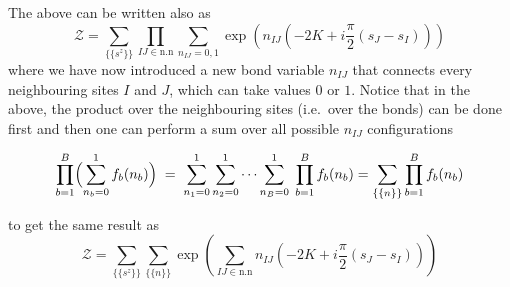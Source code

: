 \documentclass[11pt]{article}
\numberwithin{equation}{section}
\begin{document}
The above can be written also as 
\begin{equation*}
    \mathcal{Z}= \sum_{\{\{s^z\}\}} \prod_{IJ\in \text{n.n}} \sum_{n_{IJ}=0,1} \exp\left(n_{IJ} \left(-2K + i\frac{\pi}{2} (s_J-s_I)\right)\right)
\end{equation*}
where we have now introduced a new bond variable \(n_{IJ}\) that connects every neighbouring sites \(I\) and \(J\), which can take values \(0\) or \(1\). Notice that in the above, the product over the neighbouring sites (i.e.\ over the bonds) can be done first and then one can perform a sum over all possible \(n_{IJ}\) configurations

\textcolor{red}{
    \begin{equation*}
        \prod_{b=1}^{B}\Bigl(\sum_{n_{b}=0}^{1}f_{b}(n_{b})\Bigr)\;=\;\sum_{n_{1}=0}^{1}\sum_{n_{2}=0}^{1}\cdots\sum_{n_{B}=0}^{1}\;\prod_{b=1}^{B}f_{b}(n_{b}) = \sum_{\{\{n\}\}} \prod_{b=1}^{B}f_{b}(n_{b}) 
    \end{equation*}
}

to get the same result as 
\begin{equation*}
    \mathcal{Z}= \sum_{\{\{s^z\}\}} \sum_{\{\{n\}\}}  \exp\left(\sum_{IJ\in \text{n.n}}n_{IJ} \left(-2K + i\frac{\pi}{2} (s_J-s_I)\right)\right)
\end{equation*}
\end{document}
